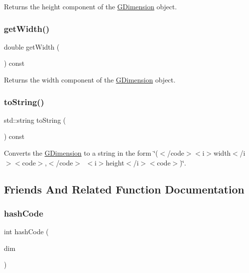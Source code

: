 Returns the height component of the {\ttfamily \mbox{\hyperlink{classGDimension}{G\+Dimension}}} object. 

\mbox{\label{classGDimension_a0ed2965abd4f5701d2cadf71239faf19}} 
\subsubsection{\texorpdfstring{get\+Width()}{getWidth()}}
{\footnotesize\ttfamily double get\+Width (\begin{DoxyParamCaption}{ }\end{DoxyParamCaption}) const}



Returns the width component of the {\ttfamily \mbox{\hyperlink{classGDimension}{G\+Dimension}}} object. 

\mbox{\label{classGDimension_a1fe5121d6528fdea3f243321b3fa3a49}} 
\subsubsection{\texorpdfstring{to\+String()}{toString()}}
{\footnotesize\ttfamily std\+::string to\+String (\begin{DoxyParamCaption}{ }\end{DoxyParamCaption}) const}



Converts the {\ttfamily \mbox{\hyperlink{classGDimension}{G\+Dimension}}} to a string in the form {\ttfamily \char`\"{}($<$/code$>$$<$i$>$width$<$/i$>$$<$code$>$,$<$/code$>$~$<$i$>$height$<$/i$>$$<$code$>$)\char`\"{}}. 



\subsection{Friends And Related Function Documentation}
\mbox{\label{classGDimension_a234b578e512fa99a9f3a829f5e461454}} 
\subsubsection{\texorpdfstring{hash\+Code}{hashCode}}
{\footnotesize\ttfamily int hash\+Code (\begin{DoxyParamCaption}\item[{const \mbox{\hyperlink{classGDimension}{G\+Dimension}} \&}]{dim }\end{DoxyParamCaption})\hspace{0.3cm}{\ttfamily [friend]}}



